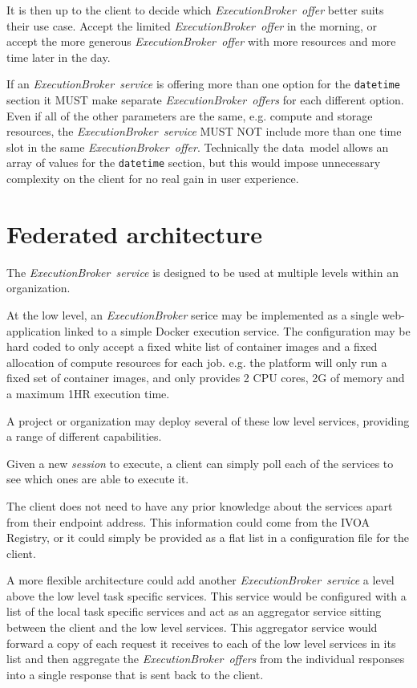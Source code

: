 \documentclass[11pt,a4paper]{ivoa}
\newcommand{\datamodel} {data~model}
\newcommand{\ivoa} {IVOA}
\newcommand{\execbrokerclass} {\textit{ExecutionBroker}}
\newcommand{\execbrokerservice}[1] {\textit{ExecutionBroker~service#1}}
\newcommand{\execoffer}[1] {\textit{ExecutionBroker~offer#1}}
\newcommand{\workerjob}[1] {\textit{session#1}}
\newcommand{\docker} {Docker}
\newcommand{\codeword}[1] {\texttt{#1}}
\newcommand{\cpu}[1] {CPU#1}
\begin{document}
It is then up to the client to decide which \execoffer{} better suits their use case.
Accept the limited \execoffer{} in the morning, or accept the more generous \execoffer{} with
more resources and more time later in the day.

If an \execbrokerservice{} is offering more than one option for the \codeword{datetime}
section it MUST make separate \execoffer{s} for each different option.
Even if all of the other parameters are the same, e.g. compute and storage resources, the
\execbrokerservice{} MUST NOT include more than one time slot in the same \execoffer{}.
Technically the \datamodel{} allows an array of values for the \codeword{datetime} section,
but this would impose unnecessary complexity on the client for no real gain in user experience.

\pagebreak

\section{Federated architecture}
\label{federation}

The \execbrokerservice{} is designed to be used at multiple levels within an organization.

At the low level, an \execbrokerclass{} serice may be implemented as a
single web-application linked to a simple \docker{} execution service.
The configuration may be hard coded to only accept a fixed white list of container images
and a fixed allocation of compute resources for each job{}.
e.g. the platform will only run a fixed set of container images, and only provides 2 \cpu{} cores, 2G of memory and a maximum 1HR execution time.

A project or organization may deploy several of these low level services,
providing a range of different capabilities.

Given a new \workerjob{} to execute, a client can simply poll each of the services to see which ones are
able to execute it.

The client does not need to have any prior knowledge about the services apart from their
endpoint address.
This information could come from the \ivoa{} Registry, or it could simply
be provided as a flat list in a configuration file for the client.

A more flexible architecture could add another \execbrokerservice{}
a level above the low level task specific services.
This service would be configured with a list of the local task specific services
and act as an aggregator service sitting between the client and the low level services.
This aggregator service would forward a copy of each request it receives to each of the low level services in its list and
then aggregate the \execoffer{s} from the individual responses into a single response that is sent back to the client.
\end{document}
